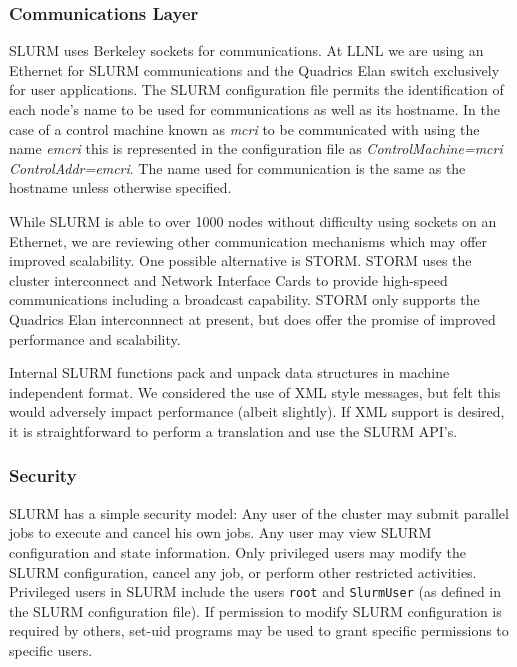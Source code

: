 \subsubsection{Communications Layer}

SLURM uses Berkeley sockets for communications. 
At LLNL we are using an Ethernet for SLURM communications and 
the Quadrics Elan switch exclusively for user applications. 
The SLURM configuration file permits the identification of each 
node's name to be used for communications as well as its hostname. 
In the case of a control machine known as {\em mcri} to be communicated 
with using the name {\em emcri} this is represented in the 
configuration file as {\em ControlMachine=mcri ControlAddr=emcri}.
The name used for communication is the same as the hostname unless 
otherwise specified.

While SLURM is able to over 1000 nodes without difficulty using 
sockets on an Ethernet, we are reviewing other communication 
mechanisms which may offer improved scalability. 
One possible alternative is STORM\cite{STORM2001}. 
STORM uses the cluster interconnect and Network Interface Cards to 
provide high-speed communications including a broadcast capability. 
STORM only supports the Quadrics Elan interconnnect at present, but does 
offer the promise of improved performance and scalability. 

Internal SLURM functions pack and unpack data structures in machine 
independent format. We considered the use of XML style messages, 
but felt this would adversely impact performance (albeit slightly). 
If XML support is desired, it is straightforward to perform a translation 
and use the SLURM API's.

\subsubsection{Security}

SLURM has a simple security model: 
Any user of the cluster may submit parallel jobs to execute and cancel
his own jobs.  Any user may view SLURM configuration and state
information.  
Only privileged users may modify the SLURM configuration,
cancel any job, or perform other restricted activities.  
Privileged users in SLURM include the users {\tt root} 
and {\tt SlurmUser} (as defined in the SLURM configuration file). 
If permission to modify SLURM configuration is 
required by others, set-uid programs may be used to grant specific
permissions to specific users.

